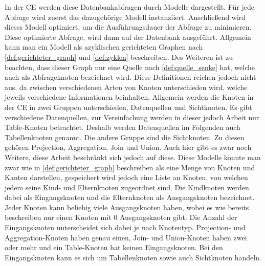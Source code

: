 In der \ac{CE} werden diese Datenbankabfragen durch Modelle dargestellt. Für
jede Abfrage wird zuerst das dazugehörige Modell instanziiert. Anschließend
wird dieses Modell optimiert, um die Ausführungsdauer der Abfrage zu
minimieren.  Diese optimierte Abfrage, wird dann auf der Datenbank ausgeführt.
Allgemein kann man ein Modell als azyklischen gerichteten Graphen nach
\autoref{def:gerichteter_graph} und \autoref{def:zyklen} beschreiben. Des
Weiteren ist zu beachten, dass dieser Graph nur eine Quelle nach
\autoref{def:quelle_senke} hat, welche auch als Abfrageknoten bezeichnet wird.
Diese Definitionen reichen jedoch nicht aus, da zwischen verschiedenen Arten
von Knoten unterschieden wird, welche jeweils verschiedene Informationen
beinhalten.  Allgemein werden die Knoten in der \ac{CE} in zwei Gruppen
unterschieden, Datenquellen und Sichtknoten. Es gibt verschiedene Datenquellen,
zur Vereinfachung werden in dieser jedoch Arbeit nur
\foreignlanguage{english}{Table}-Knoten betrachtet. Deshalb werden Datenquellen
im Folgenden auch Tabellenknoten genannt.
Die andere Gruppe sind die Sichtknoten. Zu diesen gehören \zB
\foreignlanguage{english}{Projection}, \foreignlanguage{english}{Aggregation},
\foreignlanguage{english}{Join} und \foreignlanguage{english}{Union}. Auch hier
gibt es zwar noch Weitere, diese Arbeit beschränkt sich jedoch auf diese.
Diese Modelle könnte man zwar wie in \autoref{def:gerichteter_graph}
beschreiben als eine Menge von Knoten und Kanten darstellen, gespeichert wird
jedoch eine Liste an Knoten, von welchen jedem seine Kind- und Elternknoten
zugeordnet sind. Die Kindknoten werden dabei als Eingangsknoten und die
Elternknoten als Ausgangsknoten bezeichnet. Jeder Knoten kann beliebig viele
Ausgangsknoten haben, wobei es wie bereits beschreiben nur einen Knoten mit $0$
Ausgangsknoten gibt. Die Anzahl der Eingangsknoten unterscheidet sich dabei je
nach Knotentyp.
\foreignlanguage{english}{Projection}- und
\foreignlanguage{english}{Aggregation}-Knoten haben genau einen, 
\foreignlanguage{english}{Join}- und \foreignlanguage{english}{Union}-Knoten
haben zwei oder mehr und ein \foreignlanguage{english}{Table}-Knoten hat keinen
Eingangsknoten. Bei den Eingangsknoten kann es sich um Tabellenknoten
sowie auch Sichtknoten handeln. \autocite[Vgl.][/Create Calculation
Views/Supported View Nodes for Modeling Calculation
Views]{SapHanaCreateCalcViews}


